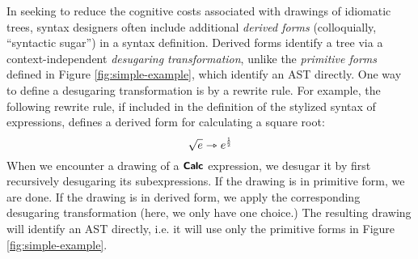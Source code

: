 In seeking to reduce the cognitive costs associated with drawings of idiomatic trees, syntax designers  often  include additional \emph{derived forms} (colloquially, ``syntactic sugar'') in a syntax definition.  Derived forms identify a tree via a context-independent \emph{desugaring transformation}, unlike the \emph{primitive forms} defined in Figure \ref{fig:simple-example}, which identify an AST directly. One way to define a desugaring transformation is by a rewrite rule. For example, the following rewrite rule, if included in the definition of the stylized syntax of expressions, defines a derived form for calculating a square root:
\begin{equation}\label{rule:simplelang-sqrt}
\sqrt{e} \rightarrowtriangle e^{\frac{\numintro{1}}{\numintro{2}}}
\end{equation}
When we encounter a drawing of a $\textsf{\textbf{\small Calc}}$ expression, we desugar  it by first recursively desugaring its subexpressions. If the drawing is in primitive form, we are done.  If the drawing is in derived form, we apply the corresponding desugaring transformation (here, we only have one choice.) The resulting drawing will identify an AST directly, i.e. it will use only the primitive forms in Figure \ref{fig:simple-example}.

